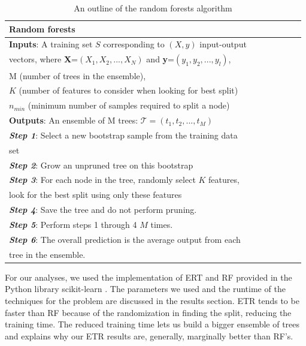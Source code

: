 \documentclass[a4paper,fleqn,usenatbib]{mnras}
\begin{document}
\begin{table}
 \caption{An outline of the random forests algorithm}
 \label{rf}
 \begin{tabular}{@{}lcccccc}
  \hline
  \hline
  Random forests \\
  \hline
  \textbf{Inputs}: A training set $S$ corresponding to \textbf{$(X, y)$} input-output \\ vectors, where \textbf{X}=$(X_1,X_2,...,X_N)$ and  \textbf{y}=$(y_1,y_2,...,y_l)$, \\ M (number of trees in the ensemble), \\  $K$ (number of features to consider when looking for best split) \\ $n_{min}$ (minimum number of samples required to split a node)\\
  \textbf{Outputs}: An ensemble of M trees: $\mathcal{T} = (t_1, t_2,...,t_M)$ \\
  \hline
  \textbf{\textit{Step 1}}: Select a new bootstrap sample from the training data \\ set \\
  \hline
  \textbf{\textit{Step 2}}: Grow an unpruned tree on this bootstrap \\
  \hline 
  \textbf{\textit{Step 3}}: For each node in the tree, randomly select $K$ features, \\ look for the best split using only these features \\
  \hline
  \textbf{\textit{Step 4}}: Save the tree and do not perform pruning. \\ 
  \hline
  \textbf{\textit{Step 5}}: Perform steps 1 through 4 $M$ times. \\
  \hline
  \textbf{\textit{Step 6}}: The overall prediction is the average output from each \\ tree in the ensemble. \\
	\hline
\end{tabular}
\end{table}

\par For our analyses, we used the implementation of ERT and RF provided in the Python library scikit-learn \citep{pedregosa2011scikit}. The parameters we used and the runtime of the techniques for the problem are discussed in the results section. ETR tends to be faster than RF because of the randomization in finding the split, reducing the training time. The reduced training time lets us build a bigger ensemble of trees and explains why our ETR results are, generally, marginally better than RF's. 
\end{document}
